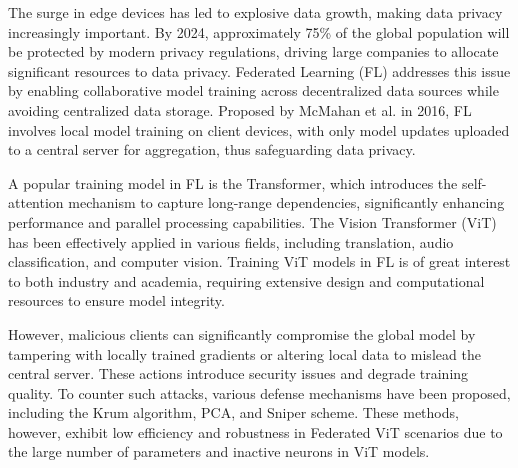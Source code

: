 \documentclass[conference]{IEEEtran}
\begin{document}

The surge in edge devices has led to explosive data growth, making data privacy increasingly important\cite{edgeComputing_explosiveGrowth}. By 2024, approximately 75\% of the global population will be protected by modern privacy regulations, driving large companies to allocate significant resources to data privacy. Federated Learning (FL) addresses this issue by enabling collaborative model training across decentralized data sources while avoiding centralized data storage\cite{useFL2solve}. Proposed by McMahan et al. in 2016, FL involves local model training on client devices, with only model updates uploaded to a central server for aggregation, thus safeguarding data privacy\cite{FLGenesisArticle}.

A popular training model in FL is the Transformer, which introduces the self-attention mechanism to capture long-range dependencies, significantly enhancing performance and parallel processing capabilities\cite{transformer}. The Vision Transformer (ViT) has been effectively applied in various fields, including translation\cite{transformer_translation}, audio classification\cite{transformer_audioClassification}, and computer vision\cite{transformer_vision}. Training ViT models in FL is of great interest to both industry and academia\cite{transformer_gotInterest}, requiring extensive design and computational resources to ensure model integrity\cite{MrZhou_IoE_MTD}.

However, malicious clients can significantly compromise the global model by tampering with locally trained gradients or altering local data to mislead the central server. These actions introduce security issues and degrade training quality. To counter such attacks, various defense mechanisms have been proposed, including the Krum algorithm\cite{aggregation_Krum}, PCA\cite{federatedPCA}, and Sniper scheme\cite{aggregation_Sniper}. These methods, however, exhibit low efficiency and robustness in Federated ViT scenarios due to the large number of parameters and inactive neurons in ViT models\cite{MrZhou_IoE_Shuffle}.
\end{document}

